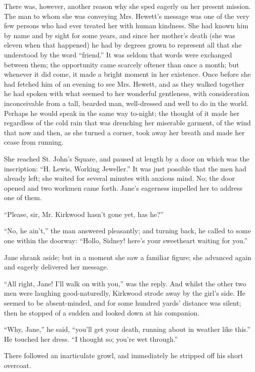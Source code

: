 There was, however, another reason why she sped eagerly on her present
mission. The man to whom she was conveying Mrs. Hewett's message was one
of the very few persons who had ever treated her with human kindness.
She had known him by name and by sight for some years, and since her
mother's death (she was eleven when that happened) he had by degrees
grown to represent all that she understood by the word ``friend.'' It
was seldom that words were exchanged between them; the opportunity came
scarcely oftener than once a month; but whenever it did come, it made a
bright moment in her existence. Once before she had fetched him of an
evening to see Mrs. Hewett, and as they walked together he had spoken
with what seemed to her wonderful gentleness, with consideration
{}inconceivable from a tall, bearded man, well-dressed and well to do in
the world. Perhaps he would speak in the same way to-night; the thought
of it made her regardless of the cold rain that was drenching her
miserable garment, of the wind that now and then, as she turned a
corner, took away her breath and made her cease from running.

She reached St. John's Square, and paused at length by a door on which
was the inscription: ``H. Lewis, Working Jeweller.'' It was just
possible that the men had already left; she waited for several minutes
with anxious mind. No; the door opened and two workmen came forth.
Jane's eagerness impelled her to address one of them.

``Please, sir, Mr. Kirkwood hasn't gone yet, has he?''

``No, he ain't,'' the man answered pleasantly; and turning back, he
called to some one within the doorway: ``Hollo, Sidney! here's your
sweetheart waiting for you.''

Jane shrank aside; but in a moment she {}saw a familiar figure; she
advanced again and eagerly delivered her message.

``All right, Jane! I'll walk on with you,'' was the reply. And whilst
the other two men were laughing good-naturedly, Kirkwood strode away by
the girl's side. He seemed to be absent-minded, and for some hundred
yards' distance was silent; then he stopped of a sudden and looked down
at his companion.

``Why, Jane,'' he said, ``you'll get your death, running about in
weather like this.'' He touched her dress. ``I thought so; you're wet
through.''

There followed an inarticulate growl, and immediately he stripped off
his short overcoat.

